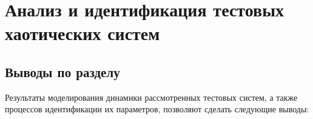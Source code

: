 \chapter{Анализ и идентификация тестовых хаотических систем }
\label{atu:ch:testsys}















\section{Выводы по разделу \thechapter}  %

Результаты моделирования динамики рассмотренных тестовых систем,
а также процессов идентификации их параметров,
позволяют сделать следующие выводы:

